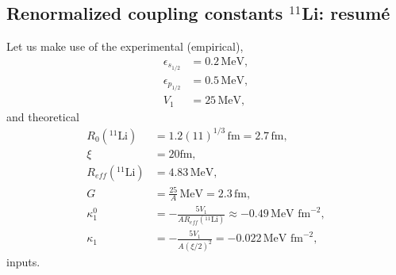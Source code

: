 \begin{subappendices}
 \section{Renormalized coupling constants $^{11}$Li: resum\'e}\label{C2SF2}
 Let us make use of the experimental (empirical),
 \begin{align*}
 \epsilon_{s_{1/2}}&=0.2\, \text{MeV},\\
  \epsilon_{p_{1/2}}&=0.5\, \text{MeV},\\
  V_1&=25\, \text{MeV},
 \end{align*}
and theoretical
  \begin{align*}
R_0(^{11}\text{Li})&=1.2 (11)^{1/3}\,\text{fm}=2.7\,\text{fm},\\
\xi&=20\text{fm},\\
R_{eff}(^{11}\text{Li})&=4.83\,\text{MeV},\\
G&=\frac{25}{A}\,\text{MeV}=2.3\,\text{fm},\\
\kappa_1^0&=-\frac{5V_1}{A R_{eff}(^{11}\text{Li})}\approx -0.49\,\text{MeV fm}^{-2},\\
\kappa_1&=-\frac{5V_1}{A \left(\xi/2\right)^2}= -0.022\,\text{MeV fm}^{-2},
  \end{align*}
 inputs.
 

\end{subappendices}
